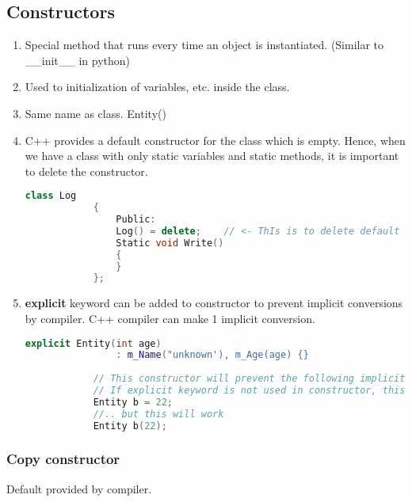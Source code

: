 \documentclass{article}
\begin{document}
    \subsection{Constructors}
    
    \begin{enumerate}
        \item Special method that runs every time an object is instantiated. (Similar to  \_\_init\_\_ in python)
        \item Used to initialization of variables, etc. inside the class.
        \item Same name as class. Entity() {}
        \item C++ provides a default constructor for the class which is empty. Hence, when we have a class with only static variables and static methods, it is important to delete the constructor.

        \begin{lstlisting}[language=C++, caption=Delete constructor example]
            class Log
            {
                Public:
                Log() = delete;    // <- ThIs is to delete default constructor
                Static void Write()
                {
                }
            };
        \end{lstlisting}
    
        \item \textbf{explicit} keyword can be added to constructor to prevent implicit conversions by compiler. C++ compiler can make 1 implicit conversion.
        \begin{lstlisting}[language=C++, caption=Explicit keyword]
            explicit Entity(int age)
                : m_Name("unknown'), m_Age(age) {}
            
            // This constructor will prevent the following implicit conversion by compiler
            // If explicit keyword is not used in constructor, this will work
            Entity b = 22;  
            //.. but this will work 
            Entity b(22);
        \end{lstlisting}
    
    \end{enumerate}
   
    \subsubsection{Copy constructor}
        
        Default provided by compiler. 
        
\end{document}
